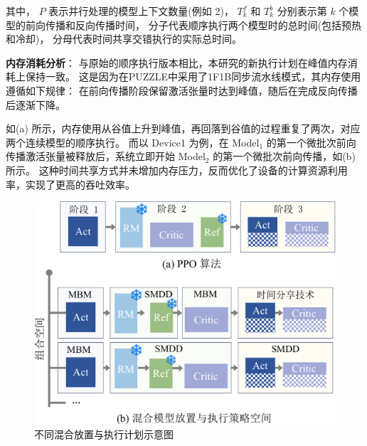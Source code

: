其中，
$P$ 表示并行处理的模型上下文数量(例如 2)，
$T^f_k$ 和 $T^b_k$ 分别表示第 $k$ 个模型的前向传播和反向传播时间，
分子代表顺序执行两个模型时的总时间(包括预热和冷却)，
分母代表时间共享交错执行的实际总时间。



\textbf{内存消耗分析}：
与原始的顺序执行版本相比，本研究的新执行计划在峰值内存消耗上保持一致。
这是因为在PUZZLE中采用了1F1B同步流水线模式，其内存使用遵循如下规律：  
在前向传播阶段保留激活张量时达到峰值，随后在完成反向传播后逐渐下降。

如(a) 所示，内存使用从谷值上升到峰值，再回落到谷值的过程重复了两次，对应两个连续模型的顺序执行。  
而以 Device1 为例，在 Model$_1$ 的第一个微批次前向传播激活张量被释放后，系统立即开始 Model$_2$ 的第一个微批次前向传播，如(b) 所示。  
这种时间共享方式并未增加内存压力，反而优化了设备的计算资源利用率，实现了更高的吞吐效率。




\begin{figure}[ht]
    \centering
    \includegraphics[width=0.7\linewidth]{figures/puzzle/4-hybrid-plan-2-crop.pdf}
    \caption{不同混合放置与执行计划示意图}
    \label{fig:hybrid-plan}
\end{figure}

